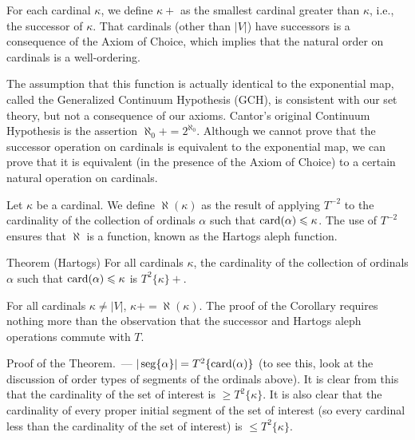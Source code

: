 \begin{definition}
 For each cardinal $\kappa$, we define $\kappa+$ as
 the smallest cardinal greater than $\kappa$, i.e., the
 successor of 
 $\kappa$.  That cardinals (other than $|V|$) have successors is a
 consequence of the Axiom of Choice, which implies that
 the natural order on cardinals is a
 well-ordering. 
\end{definition}

The assumption that this function is actually identical to the
exponential map, called the Generalized Continuum Hypothesis
(GCH), is 
consistent with our set theory, but not a consequence of our axioms.
Cantor's original Continuum Hypothesis is the assertion
$\aleph_0+=2^{\aleph_0}$.  Although we cannot prove that the
successor 
operation on cardinals is equivalent to the exponential
map, we can prove that it is equivalent (in the presence of the Axiom of
Choice) 
to a certain natural operation on cardinals.

\begin{definition}
 Let $\kappa$ be a cardinal.  We define
 $\aleph(\kappa)$ as the result of applying $T^{-2}$ to the
 cardinality of the collection of
 ordinals $\alpha$ such that $\mathop{\mathrm{card}}(\alpha)\leqslant\kappa$.
 The use of $T^{-2}$ ensures that $\aleph$ 
 is a function, known as the {\upshape Hartogs aleph function}.
\end{definition}

\begin{Thm}{Theorem (Hartogs)}
 For all cardinals $\kappa$, the cardinality of
 the collection of ordinals $\alpha$ such that
 $\mathop{\mathrm{card}}(\alpha)\leqslant\kappa$ is $T^2\{\kappa\}+$.  
\end{Thm}

\begin{cor}
 For all cardinals $\kappa\neq|V|$, $\kappa+ =
 \aleph(\kappa)$.  The proof of the Corollary requires nothing more
 than the observation that the successor and Hartogs
 aleph operations commute with $T$.
\end{cor}

{\sc Proof of the Theorem.~---} $|\mathop{\mathrm{seg}}\{\alpha\}| =
T^2\{\mathop{\mathrm{card}}(\alpha)\}$
(to see this, look at the discussion of order types of
segments of the ordinals above).  It is clear from this
that the cardinality of the 
set of interest is $\geq T^2\{\kappa\}$.  It is also clear that the
cardinality of every proper initial segment of the set
of interest (so every cardinal less than the cardinality of the set of
interest) is $\leq T^2\{\kappa\}$.

